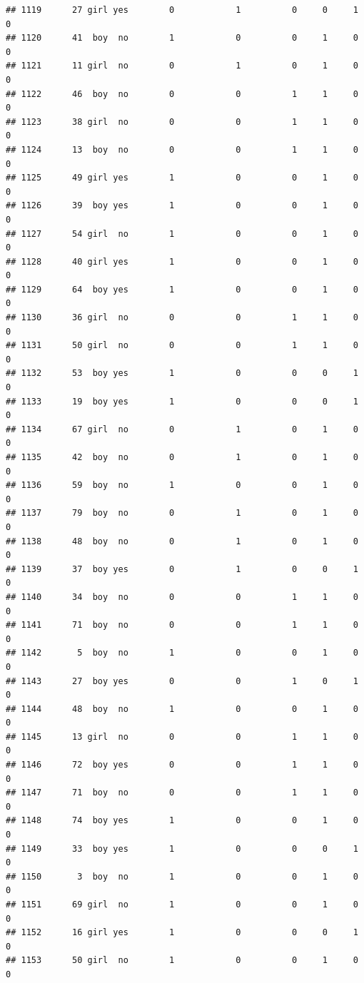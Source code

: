 \documentclass[man]{apa6}
\begin{document}
\begin{verbatim}
## 1119      27 girl yes        0            1          0     0     1     0
## 1120      41  boy  no        1            0          0     1     0     0
## 1121      11 girl  no        0            1          0     1     0     0
## 1122      46  boy  no        0            0          1     1     0     0
## 1123      38 girl  no        0            0          1     1     0     0
## 1124      13  boy  no        0            0          1     1     0     0
## 1125      49 girl yes        1            0          0     1     0     0
## 1126      39  boy yes        1            0          0     1     0     0
## 1127      54 girl  no        1            0          0     1     0     0
## 1128      40 girl yes        1            0          0     1     0     0
## 1129      64  boy yes        1            0          0     1     0     0
## 1130      36 girl  no        0            0          1     1     0     0
## 1131      50 girl  no        0            0          1     1     0     0
## 1132      53  boy yes        1            0          0     0     1     0
## 1133      19  boy yes        1            0          0     0     1     0
## 1134      67 girl  no        0            1          0     1     0     0
## 1135      42  boy  no        0            1          0     1     0     0
## 1136      59  boy  no        1            0          0     1     0     0
## 1137      79  boy  no        0            1          0     1     0     0
## 1138      48  boy  no        0            1          0     1     0     0
## 1139      37  boy yes        0            1          0     0     1     0
## 1140      34  boy  no        0            0          1     1     0     0
## 1141      71  boy  no        0            0          1     1     0     0
## 1142       5  boy  no        1            0          0     1     0     0
## 1143      27  boy yes        0            0          1     0     1     0
## 1144      48  boy  no        1            0          0     1     0     0
## 1145      13 girl  no        0            0          1     1     0     0
## 1146      72  boy yes        0            0          1     1     0     0
## 1147      71  boy  no        0            0          1     1     0     0
## 1148      74  boy yes        1            0          0     1     0     0
## 1149      33  boy yes        1            0          0     0     1     0
## 1150       3  boy  no        1            0          0     1     0     0
## 1151      69 girl  no        1            0          0     1     0     0
## 1152      16 girl yes        1            0          0     0     1     0
## 1153      50 girl  no        1            0          0     1     0     0

\end{verbatim}
\end{document}
